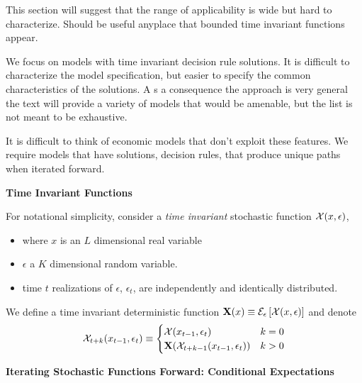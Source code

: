 \documentclass[12pt]{article}
\begin{document}
This section will suggest that the range of applicability is wide but
hard to characterize.
Should be useful anyplace that bounded time invariant functions appear.

We focus on models with time invariant decision rule solutions. 
It is difficult to characterize the model specification, but easier to specify the common characteristics of the solutions.  A s a consequence the approach is very general the text will provide a variety of models that would be amenable, but the list is not meant to be exhaustive.


It is difficult to think of economic models  that don't exploit these features.
We require models that have solutions, decision rules, that produce unique paths when iterated forward.  

 {\bf Time Invariant Functions}

For notational simplicity, consider a {\it time invariant } stochastic function $\mathcal{X}(x,\epsilon)$, 
\begin{itemize}
\item where $x$ is an $L$ dimensional real variable
\item $\epsilon$ a $K$ dimensional random variable.
\item time $t$ realizations of $\epsilon$, $\epsilon_t$, are independently and identically distributed.  
\end{itemize}
We define a time invariant deterministic function $\mathbf{X}(x)\equiv \mathcal{E}_{\epsilon} \left [\mathcal{X}(x,\epsilon) \right ]$ and denote
\begin{gather*}
\mathcal{X}_{t+k}{(x_{t-1},\epsilon_t)}\equiv\begin{cases}
\mathcal{X}{(x_{t-1},\epsilon_t)} &k=0\\
\mathbf{X}{(\mathcal{X}_{t+k-1}{(x_{t-1},\epsilon_t)})} &k>0
\end{cases}
\end{gather*}

 {\bf Iterating Stochastic Functions Forward: Conditional Expectations}
\end{document}

